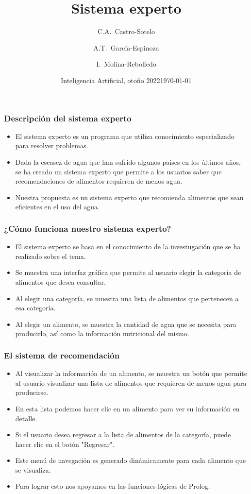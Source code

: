 \documentclass[aspectratio=169]{beamer}
\title{Sistema experto}
\author[Castro-Sotelo, García-Espinoza, Molina-Rebolledo] %
{C.A.~Castro-Sotelo \and A.T.~García-Espinoza \and I.~Molina-Rebolledo}
\institute[BUAP] %
{
  Facultad de Ciencias de la Computación\\
  Benemérita Universidad Autónoma de Puebla
}
\date[Otoño 2022] %
{Inteligencia Artificial, otoño 2022}
\date{\today}
\begin{document}
\frame{\titlepage}


\begin{frame}
\frametitle{Descripción del sistema experto}

\begin{itemize}[<+->]
\item El sistema experto es un programa que utiliza conocimiento especializado para resolver problemas.
\item Dada la escasez de agua que han sufrido algunos países en los últimos años, se ha creado un sistema experto que permite a los usuarios saber que recomendaciones de alimentos requieren de menos agua.
\item Nuestra propuesta es un sistema experto que recomienda alimentos que sean eficientes en el uso del agua.
\end{itemize}
\end{frame}

\begin{frame}
\frametitle{¿Cómo funciona nuestro sistema experto?}

\begin{itemize}[<+->]
\item El sistema experto se basa en el conocimiento de la investugación que se ha realizado sobre el tema.
\item Se muestra una interfaz gráfica que permite al usuario elegir la categoría de alimentos que desea consultar.
\item Al elegir una categoría, se muestra una lista de alimentos que pertenecen a esa categoría.
\item Al elegir un alimento, se muestra la cantidad de agua que se necesita para producirlo, así como la
  información nutricional del mismo.
\end{itemize}
\end{frame}

\begin{frame}
\frametitle{El sistema de recomendación}

\begin{itemize}[<+->]
  \item Al visualizar la información de un alimento, se muestra un botón que permite al usuario
    visualizar una lista de alimentos que requieren de menos agua para producirse.
  \item En esta lista podemos hacer clic en un alimento para ver su información en detalle.
  \item Si el usuario desea regresar a la lista de alimentos de la categoría, puede hacer clic en el botón
    "Regresar".
  \item Este menú de navegación es generado dinámicamente para cada alimento que se visualiza.
  \item Para lograr esto nos apoyamos en las funciones lógicas de Prolog.
\end{itemize}
\end{frame}
\end{document}
